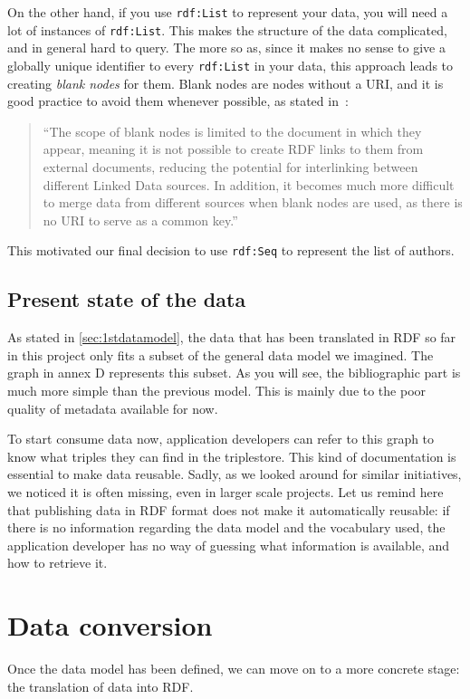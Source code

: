 \documentclass[a4paper,11pt]{report}
\begin{document}
On the other hand, if you use \texttt{rdf:List} to represent your data, you will need a lot of instances of \texttt{rdf:List}. This makes the structure of the data complicated, and in general hard to query. The more so as, since it makes no sense to give a globally unique identifier to every \texttt{rdf:List} in your data, this approach leads to creating \emph{blank nodes} for them. Blank nodes are nodes without a URI, and it is good practice to avoid them whenever possible, as stated in~\cite{Heath2011}:
\begin{quotation}
``The scope of blank nodes is limited to the document in which they appear, meaning it is not possible to create RDF links to them from external documents, reducing the potential for interlinking between different Linked Data sources. In addition, it becomes much more difficult to merge data from different sources when blank nodes are used, as there is no URI to serve as a common key.''
\end{quotation}

This motivated our final decision to use \texttt{rdf:Seq} to represent the list of authors. 
\section{Present state of the data}
As stated in \ref{sec:1stdatamodel}, the data that has been translated in RDF so far in this project only fits a subset of the general data model we imagined. The graph in annex D represents this subset. As you will see, the bibliographic part is much more simple than the previous model. This is mainly due to the poor quality of metadata available for now. 

To start consume data now, application developers can refer to this graph to know what triples they can find in the triplestore. This kind of documentation is essential to make data reusable. Sadly, as we looked around for similar initiatives, we noticed it is often missing, even in larger scale projects. Let us remind here that publishing data in RDF format does not make it automatically reusable: if there is no information regarding the data model and the vocabulary used, the application developer has no way of guessing what information is available, and how to retrieve it. 



\chapter{Data conversion}
Once the data model has been defined, we can move on to a more concrete stage: the translation of data into RDF. 
\end{document}
